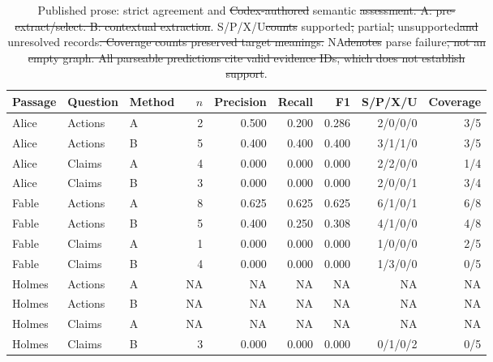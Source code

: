\documentclass[a4paper,twoside]{article}
\providecommand{\DIFaddtex}[1]{{\protect\color{blue}\uwave{#1}}} %
\providecommand{\DIFdeltex}[1]{{\protect\color{red}\sout{#1}}}                      %
\providecommand{\DIFaddFL}[1]{\DIFadd{#1}} %
\providecommand{\DIFdelFL}[1]{\DIFdel{#1}} %
\providecommand{\DIFaddbeginFL}{} %
\providecommand{\DIFaddendFL}{} %
\providecommand{\DIFdelbeginFL}{} %
\providecommand{\DIFdelendFL}{} %
\providecommand{\DIFadd}[1]{\texorpdfstring{\DIFaddtex{#1}}{#1}} %
\providecommand{\DIFdel}[1]{\texorpdfstring{\DIFdeltex{#1}}{}} %
\begin{document}
\begin{table}[t]
\vspace*{6pt}
\caption{Published prose: strict agreement and \DIFdelbeginFL \DIFdelFL{Codex-authored }\DIFdelendFL \DIFaddbeginFL \DIFaddFL{Codex }\DIFaddendFL semantic \DIFdelbeginFL \DIFdelFL{assessment. A: pre-extract/select. B: contextual extraction}\DIFdelendFL \DIFaddbeginFL \DIFaddFL{assessments}\DIFaddendFL . S/P/X/U\DIFdelbeginFL \DIFdelFL{counts }\DIFdelendFL \DIFaddbeginFL \DIFaddFL{: }\DIFaddendFL supported\DIFdelbeginFL \DIFdelFL{, }\DIFdelendFL \DIFaddbeginFL \DIFaddFL{/}\DIFaddendFL partial\DIFdelbeginFL \DIFdelFL{, }\DIFdelendFL \DIFaddbeginFL \DIFaddFL{/}\DIFaddendFL unsupported\DIFdelbeginFL \DIFdelFL{and }\DIFdelendFL \DIFaddbeginFL \DIFaddFL{/}\DIFaddendFL unresolved records\DIFdelbeginFL \DIFdelFL{. Coverage counts preserved target meanings. }\DIFdelendFL \DIFaddbeginFL \DIFaddFL{; }\DIFaddendFL NA\DIFdelbeginFL \DIFdelFL{denotes }\DIFdelendFL \DIFaddbeginFL \DIFaddFL{: }\DIFaddendFL parse failure\DIFdelbeginFL \DIFdelFL{, not an empty graph. All parseable predictions cite valid evidence IDs, which does not establish support}\DIFdelendFL .}\label{tab:prose}
\centering\small\begin{tabular}{lllrrrrrr}\toprule
Passage & Question & Method & $n$ & Precision & Recall & F1 & S/P/X/U & Coverage\\\midrule
Alice & Actions & A & 2 & 0.500 & 0.200 & 0.286 & 2/0/0/0 & 3/5 \\
Alice & Actions & B & 5 & 0.400 & 0.400 & 0.400 & 3/1/1/0 & 3/5 \\
Alice & Claims & A & 4 & 0.000 & 0.000 & 0.000 & 2/2/0/0 & 1/4 \\
Alice & Claims & B & 3 & 0.000 & 0.000 & 0.000 & 2/0/0/1 & 3/4 \\
Fable & Actions & A & 8 & 0.625 & 0.625 & 0.625 & 6/1/0/1 & 6/8 \\
Fable & Actions & B & 5 & 0.400 & 0.250 & 0.308 & 4/1/0/0 & 4/8 \\
Fable & Claims & A & 1 & 0.000 & 0.000 & 0.000 & 1/0/0/0 & 2/5 \\
Fable & Claims & B & 4 & 0.000 & 0.000 & 0.000 & 1/3/0/0 & 0/5 \\
Holmes & Actions & A & NA & NA & NA & NA & NA & NA \\
Holmes & Actions & B & NA & NA & NA & NA & NA & NA \\
Holmes & Claims & A & NA & NA & NA & NA & NA & NA \\
Holmes & Claims & B & 3 & 0.000 & 0.000 & 0.000 & 0/1/0/2 & 0/5 \\\bottomrule\end{tabular}\end{table}
\end{document}
